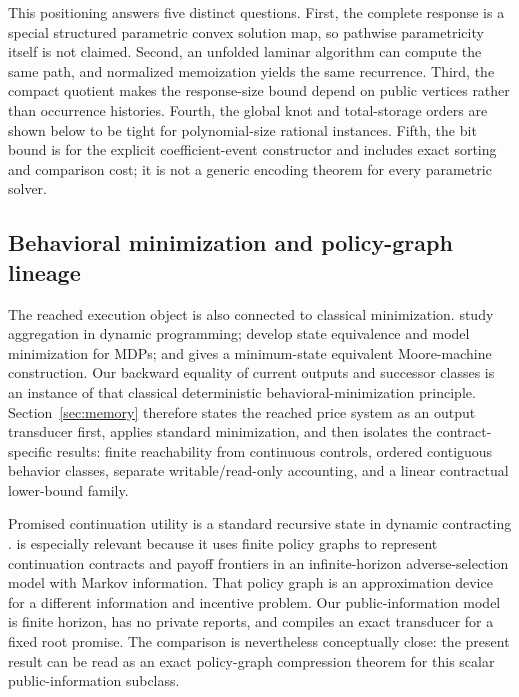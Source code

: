 This positioning answers five distinct questions. First, the complete response is a special structured parametric convex solution map, so pathwise parametricity itself is not claimed. Second, an unfolded laminar algorithm can compute the same path, and normalized memoization yields the same recurrence. Third, the compact quotient makes the response-size bound depend on public vertices rather than occurrence histories. Fourth, the global knot and total-storage orders are shown below to be tight for polynomial-size rational instances. Fifth, the bit bound is for the explicit coefficient-event constructor and includes exact sorting and comparison cost; it is not a generic encoding theorem for every parametric solver.

\subsection{Behavioral minimization and policy-graph lineage}
The reached execution object is also connected to classical minimization. \citet{BeanBirgeSmith1987} study aggregation in dynamic programming; \citet{GivanDeanGreig2003} develop state equivalence and model minimization for MDPs; and \citet{Peyriere2023} gives a minimum-state equivalent Moore-machine construction. Our backward equality of current outputs and successor classes is an instance of that classical deterministic behavioral-minimization principle. Section~\ref{sec:memory} therefore states the reached price system as an output transducer first, applies standard minimization, and then isolates the contract-specific results: finite reachability from continuous controls, ordered contiguous behavior classes, separate writable/read-only accounting, and a linear contractual lower-bound family.

Promised continuation utility is a standard recursive state in dynamic contracting \citep{SpearSrivastava1987,ThomasWorrall1988,ChenSunXiao2020}. \citet{Zhang2012} is especially relevant because it uses finite policy graphs to represent continuation contracts and payoff frontiers in an infinite-horizon adverse-selection model with Markov information. That policy graph is an approximation device for a different information and incentive problem. Our public-information model is finite horizon, has no private reports, and compiles an exact transducer for a fixed root promise. The comparison is nevertheless conceptually close: the present result can be read as an exact policy-graph compression theorem for this scalar public-information subclass.

